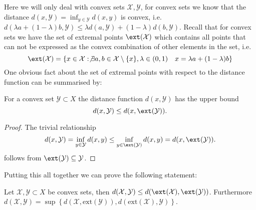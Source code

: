 Here we will only deal with convex sets $\mathcal X,\mathcal Y$, for convex sets we know that the distance $d(x,\mathcal Y) = \inf_{y\in\mathcal Y}d(x,y)$ is convex, i.e. $d(\lambda a + (1-\lambda)b,\mathcal Y)\leq\lambda d(a,\mathcal Y)+(1-\lambda) d(b,\mathcal Y)$.
%
Recall that for convex sets we have the set of extremal points $\ext(\mathcal X)$ which contains all points that can not be expressed as the convex combination of other elements in the set, i.e.
%
\begin{equation}
	\ext(\mathcal X) = \{x\in\mathcal X: \not\exists a,b\in\mathcal X\setminus\{x\} ,\lambda\in(0,1)\quad x=\lambda a + (1-\lambda) b \}
\end{equation}
%
One obvious fact about the set of extremal points with respect to the distance function can be summarised by:
%
\begin{thm}
For a convex set $\mathcal Y\subset X$ the distance function $d(x,\mathcal Y)$ has the upper bound
%
\begin{equation}
	d(x,\mathcal Y)\leq d(x,\ext(\mathcal Y)).
\end{equation}
\end{thm}
%
\begin{proof}
%
The trivial relationship
%
\begin{equation}
	d(x,\mathcal Y) = \inf_{y\in\mathcal Y} d(x,y) \leq \inf_{y\in\ext(\mathcal Y)} d(x,y) = d(x,\ext(\mathcal Y)).
\end{equation}
%
follows from $\ext(\mathcal Y)\subseteq \mathcal Y$.
\end{proof}
%
Putting this all together we can prove the following statement:
%
\begin{thm}\label{thm:Hausdorff:convex:sets:extremal:points}
Let $\mathcal X,\mathcal Y\subset X$ be convex sets, then $d(\mathcal X,\mathcal Y)\leq d(\ext(\mathcal X),\ext(\mathcal Y))$.
%
Furthermore $d(\mathcal X,\mathcal Y) = \sup\left\{d(\mathcal X,\text{ext}(\mathcal Y)),d(\text{ext}(\mathcal X),\mathcal Y)\right\}$.
\end{thm}
%
